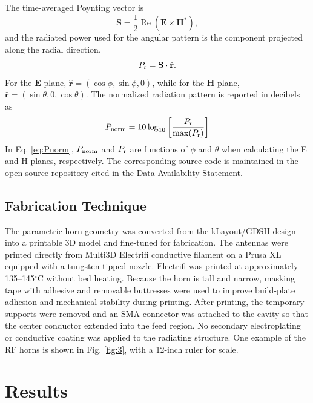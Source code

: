 \documentclass[electronics,article,submit,pdftex,moreauthors]{Definitions/mdpi}
\begin{document}
The time-averaged Poynting vector is
\begin{equation}
\mathbf{S}=\frac{1}{2}\operatorname{Re}\left(\mathbf{E}\times\mathbf{H}^{*}\right),
\end{equation}
and the radiated power used for the angular pattern is the component projected along the radial direction,
\begin{equation}
P_{\rm r}=\mathbf{S}\cdot\hat{\mathbf{r}}.
\end{equation}
For the $\mathbf{E}$-plane, $\hat{\mathbf{r}}=(\cos\phi,\sin\phi,0)$, while for the $\mathbf{H}$-plane, $\hat{\mathbf{r}}=(\sin\theta,0,\cos\theta)$.  The normalized radiation pattern is reported in decibels as
\begin{equation}
P_{\rm norm}=10\log_{10}\left[\frac{P_{\rm r}}{\max(P_{\rm r})}\right] \label{eq:Pnorm}
\end{equation}
In Eq. \ref{eq:Pnorm}, $P_{\rm norm}$ and $P_{\rm r}$ are functions of $\phi$ and $\theta$ when calculating the E and H-planes, respectively. The corresponding source code is maintained in the open-source repository cited in the Data Availability Statement.

\subsection{Fabrication Technique}
\label{sec:mat_meth_2}

The parametric horn geometry was converted from the kLayout/GDSII design into a printable 3D model and fine-tuned for fabrication.  The antennas were printed directly from Multi3D Electrifi conductive filament on a Prusa XL equipped with a tungsten-tipped nozzle.  Electrifi was printed at approximately 135--145$^{\circ}$C without bed heating.  Because the horn is tall and narrow, masking tape with adhesive and removable buttresses were used to improve build-plate adhesion and mechanical stability during printing.  After printing, the temporary supports were removed and an SMA connector was attached to the cavity so that the center conductor extended into the feed region.  No secondary electroplating or conductive coating was applied to the radiating structure.  One example of the RF horns is shown in Fig. \ref{fig:3}, with a 12-inch ruler for scale.

\section{Results}
\label{sec:results}
\end{document}

